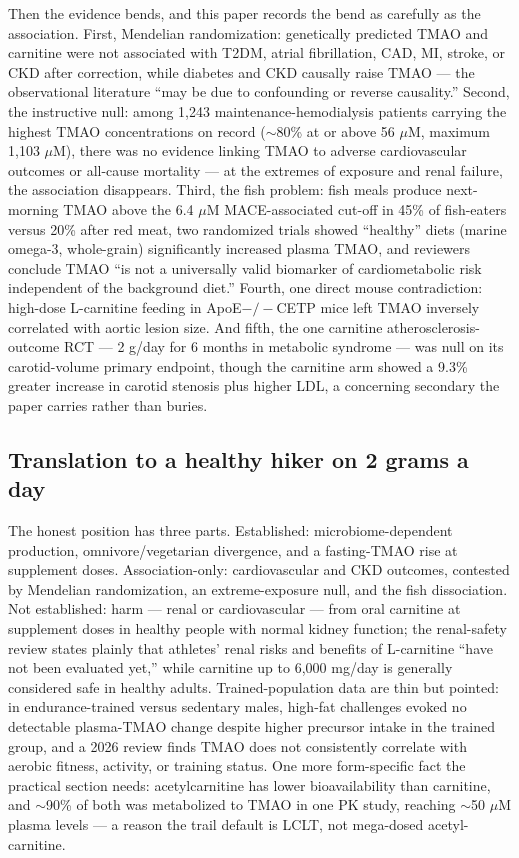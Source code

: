 Then the evidence bends, and this paper records the bend as carefully as the association. First, Mendelian randomization: genetically predicted TMAO and carnitine were not associated with T2DM, atrial fibrillation, CAD, MI, stroke, or CKD after correction, while diabetes and CKD causally raise TMAO --- the observational literature ``may be due to confounding or reverse causality.'' Second, the instructive null: among 1{,}243 maintenance-hemodialysis patients carrying the highest TMAO concentrations on record ($\sim$80\% at or above 56 $\mu$M, maximum 1{,}103 $\mu$M), there was no evidence linking TMAO to adverse cardiovascular outcomes or all-cause mortality --- at the extremes of exposure and renal failure, the association disappears. Third, the fish problem: fish meals produce next-morning TMAO above the 6.4 $\mu$M MACE-associated cut-off in 45\% of fish-eaters versus 20\% after red meat, two randomized trials showed ``healthy'' diets (marine omega-3, whole-grain) significantly increased plasma TMAO, and reviewers conclude TMAO ``is not a universally valid biomarker of cardiometabolic risk independent of the background diet.'' Fourth, one direct mouse contradiction: high-dose L-carnitine feeding in ApoE$-/-$CETP mice left TMAO inversely correlated with aortic lesion size. And fifth, the one carnitine atherosclerosis-outcome RCT --- 2 g/day for 6 months in metabolic syndrome --- was null on its carotid-volume primary endpoint, though the carnitine arm showed a 9.3\% greater increase in carotid stenosis plus higher LDL, a concerning secondary the paper carries rather than buries.

\subsection{Translation to a healthy hiker on 2 grams a day}

The honest position has three parts. Established: microbiome-dependent production, omnivore/vegetarian divergence, and a fasting-TMAO rise at supplement doses. Association-only: cardiovascular and CKD outcomes, contested by Mendelian randomization, an extreme-exposure null, and the fish dissociation. Not established: harm --- renal or cardiovascular --- from oral carnitine at supplement doses in healthy people with normal kidney function; the renal-safety review states plainly that athletes' renal risks and benefits of L-carnitine ``have not been evaluated yet,'' while carnitine up to 6{,}000 mg/day is generally considered safe in healthy adults. Trained-population data are thin but pointed: in endurance-trained versus sedentary males, high-fat challenges evoked no detectable plasma-TMAO change despite higher precursor intake in the trained group, and a 2026 review finds TMAO does not consistently correlate with aerobic fitness, activity, or training status. One more form-specific fact the practical section needs: acetylcarnitine has lower bioavailability than carnitine, and $\sim$90\% of both was metabolized to TMAO in one PK study, reaching $\sim$50 $\mu$M plasma levels --- a reason the trail default is LCLT, not mega-dosed acetyl-carnitine.

